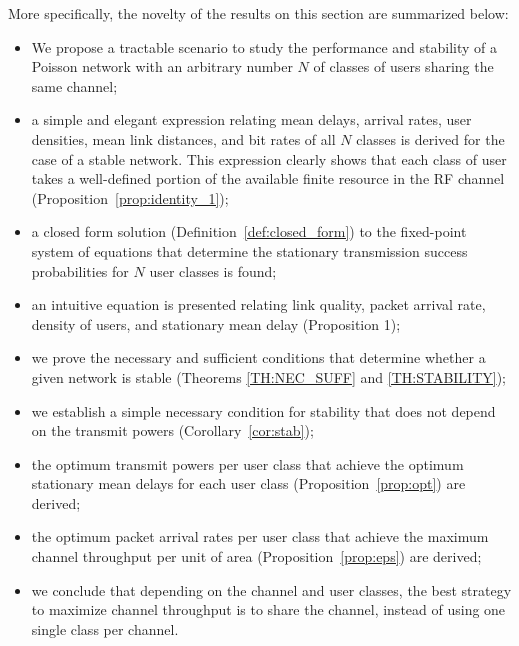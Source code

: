 More specifically, the novelty of the results on this section are summarized below:
\begin{itemize}[itemsep=3pt,parsep=3pt,topsep=3pt,partopsep=3pt]
    \item We propose a tractable scenario to study the performance and stability of a Poisson network with an arbitrary number $N$ of classes of users sharing the same channel;
    \item a simple and elegant expression relating mean delays, arrival rates, user densities, mean link distances, and bit rates of all $N$ classes is derived for the case of a stable network. This expression clearly shows that each class of user takes a well-defined portion of the available finite resource in the RF channel (Proposition~\ref{prop:identity_1});
    \item a closed form solution (Definition~\ref{def:closed_form}) to the fixed-point system of equations that determine the stationary transmission success probabilities for $N$ user classes is found;
    \item an intuitive equation is presented relating link quality, packet arrival rate, density of users, and stationary mean delay (Proposition 1);
    \item we prove the necessary and sufficient conditions that determine whether a given network is stable (Theorems \ref{TH:NEC_SUFF} and \ref{TH:STABILITY});
    \item we establish a simple necessary condition for stability that does not depend on the transmit powers (Corollary~\ref{cor:stab});
    \item the optimum transmit powers per user class that achieve the optimum stationary mean delays for each user class (Proposition~\ref{prop:opt}) are derived;
    \item the optimum packet arrival rates per user class that achieve the maximum channel throughput per unit of area (Proposition~\ref{prop:eps}) are derived;
    \item we conclude that depending on the channel and user classes, the best strategy to maximize channel throughput is to share the channel, instead of using one single class per channel.
\end{itemize}




